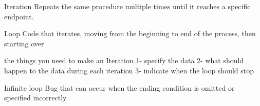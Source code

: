 Iteration 
  Repeats the same procedure multiple times until it reaches a specific endpoint.

Loop 
  Code that iterates, moving from the beginning to end of the process, then starting over 

the things you need to make an Iteration
  1- specify the data
  2- what should happen to the data during each iteration 
  3- indicate when the loop should stop

Infinite loop 
  Bug that can occur when the ending condition is omitted or specified incorrectly 